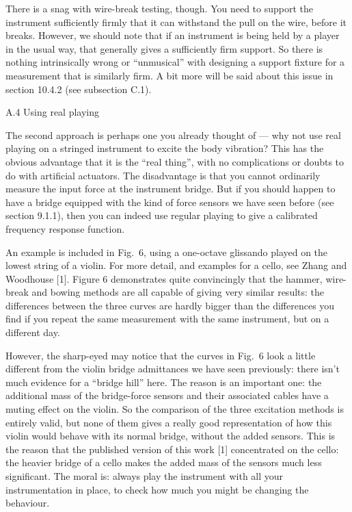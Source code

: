 
  There is a snag with wire-break testing, though. You need to support the 
  instrument sufficiently firmly that it can withstand the pull on the wire, 
  before it breaks. However, we should note that if an instrument is being held 
  by a player in the usual way, that generally gives a sufficiently firm 
  support. So there is nothing intrinsically wrong or ``unmusical'' with 
  designing a support fixture for a measurement that is similarly firm. A bit 
  more will be said about this issue in section 10.4.2 (see subsection C.1). 

  A.4 Using real playing 

  The second approach is perhaps one you already thought of — why not use real 
  playing on a stringed instrument to excite the body vibration? This has the 
  obvious advantage that it is the “real thing”, with no complications or 
  doubts to do with artificial actuators. The disadvantage is that you cannot 
  ordinarily measure the input force at the instrument bridge. But if you 
  should happen to have a bridge equipped with the kind of force sensors we 
  have seen before (see section 9.1.1), then you can indeed use regular playing 
  to give a calibrated frequency response function. 

  An example is included in Fig.\ 6, using a one-octave glissando played on the 
  lowest string of a violin. For more detail, and examples for a cello, see 
  Zhang and Woodhouse [1]. Figure 6 demonstrates quite convincingly that the 
  hammer, wire-break and bowing methods are all capable of giving very similar 
  results: the differences between the three curves are hardly bigger than the 
  differences you find if you repeat the same measurement with the same 
  instrument, but on a different day. 

  However, the sharp-eyed may notice that the curves in Fig.\ 6 look a little 
  different from the violin bridge admittances we have seen previously: there 
  isn't much evidence for a ``bridge hill'' here. The reason is an important 
  one: the additional mass of the bridge-force sensors and their associated 
  cables have a muting effect on the violin. So the comparison of the three 
  excitation methods is entirely valid, but none of them gives a really good 
  representation of how this violin would behave with its normal bridge, 
  without the added sensors. This is the reason that the published version of 
  this work [1] concentrated on the cello: the heavier bridge of a cello makes 
  the added mass of the sensors much less significant. The moral is: always 
  play the instrument with all your instrumentation in place, to check how much 
  you might be changing the behaviour. 

